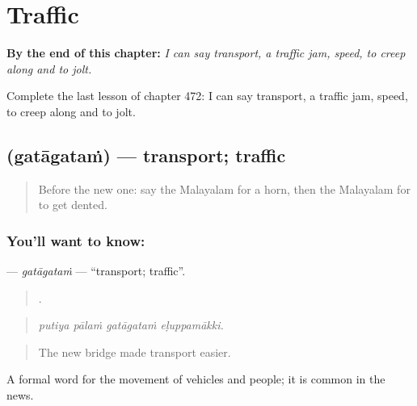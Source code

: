 
\chapter{Traffic}
\label{ch:ml-traffic}

\begin{chapteropening}
\textbf{By the end of this chapter:} \emph{I can say transport, a traffic jam, speed, to creep along and to jolt.}

Complete the last lesson of chapter 472: I can say transport, a traffic jam, speed, to creep along and to jolt.
\end{chapteropening}

\section[\texorpdfstring{\ml{ഗതാഗതം} (gatāgataṁ)}{ഗതാഗതം (gatāgataṁ)}]{ (gatāgataṁ) — transport; traffic}

\label{lesson:ML-C472-gatagatam}



\begin{quote}
Before the new one: say the Malayalam for a horn, then the Malayalam for to get dented.
\end{quote}

\subsection*{You'll want to know: }
\textbf{} — \emph{gatāgataṁ} — \textquotedblleft{}transport; traffic\textquotedblright{}.

\begin{quote}
   .
\end{quote}

\begin{quote}
\emph{putiya pālaṁ gatāgataṁ eḷuppamākki.}
\end{quote}

\begin{quote}
The new bridge made transport easier.
\end{quote}

A formal word for the movement of vehicles and people; it is common in the news.


